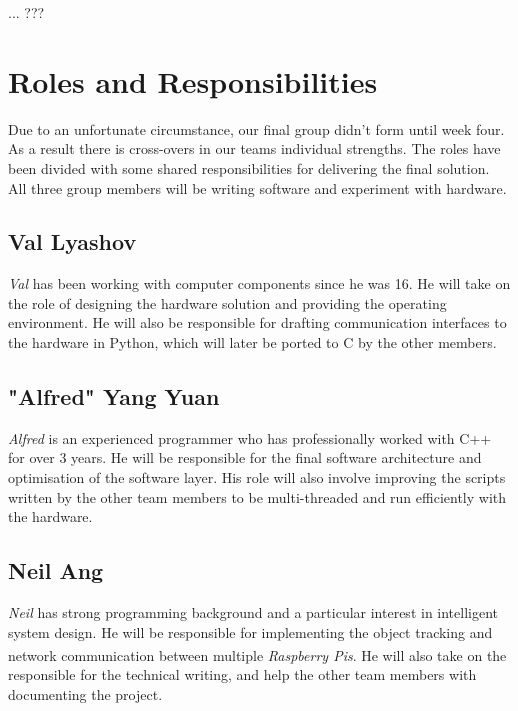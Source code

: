 \documentclass[11pt,a4paper,titlepage]{report}
\newcommand{\rpis}{\textit{Raspberry Pi\textsuperscript{\textregistered}s}}
\begin{document}
{\color{red} ... ??? }




\section{Roles and Responsibilities}



Due to an unfortunate circumstance, our final group didn't form until week four. As a result there is cross-overs in our teams individual strengths. The roles have been divided with some shared responsibilities for delivering the final solution. All three group members will be writing software and experiment with hardware.


\subsection{Val Lyashov}
\textit{Val} has been working with computer components since he was 16. He will take on the role of designing the hardware solution and providing the operating environment. He will also be responsible for drafting communication interfaces to the hardware in Python, which will later be ported to C by the other members.


\subsection{"Alfred" Yang Yuan}
\textit{Alfred} is an experienced programmer who has professionally worked with C++ for over 3 years. He will be responsible for the final software architecture and optimisation of the software layer. His role will also involve improving the scripts written by the other team members to be multi-threaded and run efficiently with the hardware.

\subsection{Neil Ang}
\textit{Neil} has strong programming background and a particular interest in intelligent system design. He will be responsible for implementing the object tracking and network communication between multiple \rpis. He will also take on the responsible for the technical writing, and help the other team members with documenting the project. 
\end{document}
